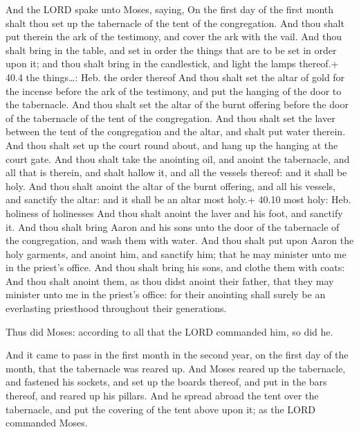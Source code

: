  And the LORD spake unto Moses, saying,  On the
first day of the first month shalt thou set up the tabernacle of the
tent of the congregation.  And thou shalt put therein the
ark of the testimony, and cover the ark with the vail.  And
thou shalt bring in the table, and set in order the things that are to
be set in order upon it; and thou shalt bring in the candlestick, and
light the lamps thereof.+ 40.4 the things\ldots: Heb. the order thereof
 And thou shalt set the altar of gold for the incense before
the ark of the testimony, and put the hanging of the door to the
tabernacle.  And thou shalt set the altar of the burnt
offering before the door of the tabernacle of the tent of the
congregation.  And thou shalt set the laver between the tent
of the congregation and the altar, and shalt put water therein.
 And thou shalt set up the court round about, and hang up
the hanging at the court gate.  And thou shalt take the
anointing oil, and anoint the tabernacle, and all that is therein, and
shalt hallow it, and all the vessels thereof: and it shall be holy.
 And thou shalt anoint the altar of the burnt offering, and
all his vessels, and sanctify the altar: and it shall be an altar most
holy.+ 40.10 most holy: Heb. holiness of holinesses  And
thou shalt anoint the laver and his foot, and sanctify it. 
And thou shalt bring Aaron and his sons unto the door of the tabernacle
of the congregation, and wash them with water.  And thou
shalt put upon Aaron the holy garments, and anoint him, and sanctify
him; that he may minister unto me in the priest's office. 
And thou shalt bring his sons, and clothe them with coats: 
And thou shalt anoint them, as thou didst anoint their father, that they
may minister unto me in the priest's office: for their anointing shall
surely be an everlasting priesthood throughout their generations.

 Thus did Moses: according to all that the LORD commanded
him, so did he.

 And it came to pass in the first month in the second
year, on the first day of the month, that the tabernacle was reared up.
 And Moses reared up the tabernacle, and fastened his
sockets, and set up the boards thereof, and put in the bars thereof, and
reared up his pillars.  And he spread abroad the tent over
the tabernacle, and put the covering of the tent above upon it; as the
LORD commanded Moses.

